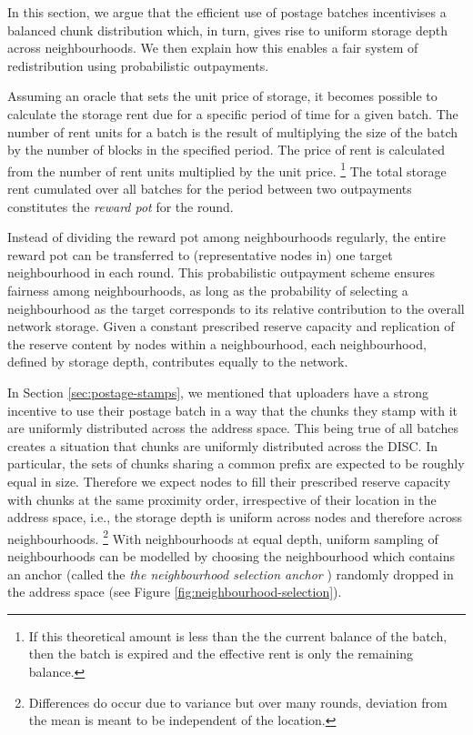 In this section, we argue that the efficient use of postage batches incentivises a balanced chunk distribution which, in turn, gives rise to uniform storage depth across neighbourhoods. We then explain how this enables a fair system of redistribution using probabilistic outpayments.


Assuming an oracle that sets the unit price of storage, it becomes possible to calculate the storage rent due for a specific period of time for a given batch. The number of rent units for a batch is the result of multiplying the size of the batch by the number of blocks in the specified period. The price of rent is calculated from the number of rent units multiplied by the unit price.%
%
\footnote{If this theoretical amount is less than the the current balance of the batch, then the batch is expired and the effective rent is only the remaining balance.}
%
The total storage rent cumulated over all batches for the period between two outpayments constitutes the \emph{reward pot} for the round.

Instead of dividing the reward pot among neighbourhoods regularly, the entire reward pot can be transferred to (representative nodes in) one target neighbourhood in each round. This probabilistic outpayment scheme ensures fairness among neighbourhoods, as long as the probability of selecting a neighbourhood as the target corresponds to its relative contribution to the overall network storage. Given a constant prescribed reserve capacity and replication of the reserve content by nodes within a neighbourhood, each neighbourhood, defined by storage depth, contributes equally to the network. 

In Section \ref{sec:postage-stamps}, we mentioned that uploaders have a strong incentive to use their postage batch in a way that the chunks they stamp with it are uniformly distributed across the address space. This being true of all batches creates a situation that chunks are uniformly distributed across the DISC. In particular, the sets of chunks sharing a common prefix are expected to be roughly equal in size. Therefore we expect nodes to fill their prescribed reserve capacity with chunks at the same proximity order, irrespective of their location in the address space, i.e., the storage depth is uniform across  nodes and therefore across neighbourhoods.%
%
\footnote{Differences do occur due to variance but over many rounds, deviation from the mean is meant to be independent of the location.}
%
With neighbourhoods at equal depth, uniform sampling of neighbourhoods can be modelled by choosing the neighbourhood which contains an anchor (called the \emph{the neighbourhood selection anchor}%
%
%
) randomly dropped in the address space (see Figure \ref{fig:neighbourhood-selection}).


